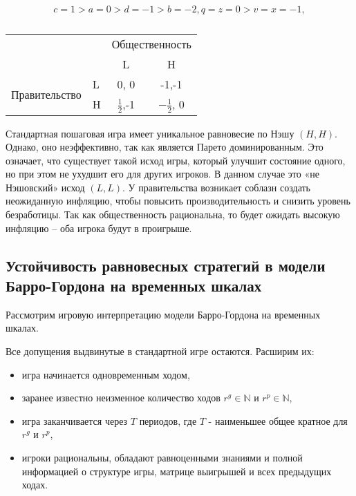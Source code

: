 \begin{equation}
\label{eq:sec:ot:exampleConstraint}
c=1 > a=0 > d=-1 > b=-2, q=z=0 > v=x=-1,
\end{equation}

\begin{table}[h]
	\centering
	
	\caption{}	
\begin{tabular}{|l|l|c|c|}
	\hline
	\multicolumn{2}{|l|}{\multirow{2}{*}{}} & \multicolumn{2}{l|}{Общественность} \\ \cline{3-4} 
	\multicolumn{2}{|l|}{}                  & L                & H                \\ \hline
	\multirow{2}{*}{Правительство}    & L   & 0, 0             & -1,-1            \\ \cline{2-4} 
	& H   & $\frac{1}{2}$,-1             & $-\frac{1}{2}$, 0            \\ \hline
\end{tabular}
		
	\label{table:sec:ot:real}
\end{table}


Стандартная пошаговая игра имеет уникальное равновесие по Нэшу $(H,H)$. Однако, оно неэффективно, так как является Парето доминированным. Это означает, что существует такой исход игры, который улучшит состояние одного, но при этом не ухудшит его для других игроков. В данном случае это «не Нэшовский» исход $(L,L)$.  У правительства возникает соблазн создать неожиданную инфляцию, чтобы повысить производительность и снизить уровень безработицы. Так как общественность рациональна, то будет ожидать высокую инфляцию – оба игрока будут в проигрыше. 


\subsection{Устойчивость равновесных стратегий в модели Барро-Гордона на
	временных шкалах} 

Рассмотрим игровую интерпретацию модели Барро-Гордона на временных шкалах.

Все допущения выдвинутые в стандартной игре остаются. Расширим их:
\begin{itemize}
	\item игра начинается одновременным ходом, 
	\item заранее известно неизменное количество ходов $r^g \in \mathbb{N}$ и $r^p \in \mathbb{N}$,
	\item игра заканчивается через $T$ периодов, где $T$ - наименьшее общее кратное для $r^g$ и $r^p$,
	\item игроки рациональны, обладают равноценными знаниями и полной информацией о структуре игры, матрице выигрышей и всех предыдущих ходах.
\end{itemize}


